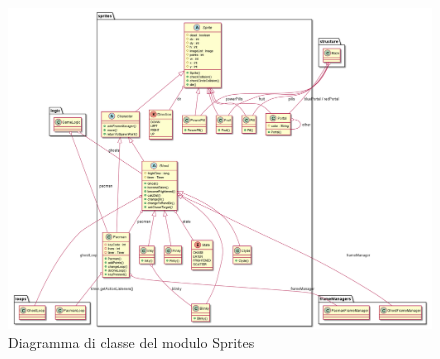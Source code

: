 \documentclass[12pt,a4paper]{report}
\begin{document}
\begin{figure}[p]
\begin{center}
 \centerline{ \includegraphics[width=20cm]{sprites}}
\end{center}
  \caption{Diagramma di classe del modulo Sprites}
  \label{fig:sprites}
\end{figure}
\end{document}
